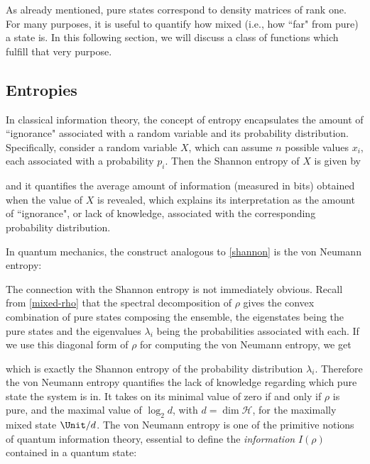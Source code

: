 \documentclass[12pt,a4paper,notitlepage]{report}
\begin{document}
As already mentioned, pure states correspond to density matrices of rank one. For many purposes, it is useful to quantify how mixed (i.e., how ``far" from pure) a state is. In this following section, we will discuss a class of functions which fulfill that very purpose.

\subsection{Entropies}
\label{sec:entropies}

In classical information theory, the concept of entropy encapsulates the amount of ``ignorance" associated with a random variable and its probability distribution. Specifically, consider a random variable $X$, which can assume $n$ possible values $x_i$, each associated with a probability $p_i$. Then the Shannon entropy \cite{shannon_1948} of $X$ is given by

%
and it quantifies the average amount of information (measured in bits) obtained when the value of $X$ is revealed, which explains its interpretation as the amount of ``ignorance", or lack of knowledge, associated with the corresponding probability distribution.

In quantum mechanics, the construct analogous to \eqref{shannon} is the von Neumann entropy:

%
The connection with the Shannon entropy is not immediately obvious. Recall from \eqref{mixed-rho} that the spectral decomposition of $\rho$ gives the convex combination of pure states composing the ensemble, the eigenstates being the pure states and the eigenvalues $\lambda_i$ being the probabilities associated with each. If we use this diagonal form of $\rho$ for computing the von Neumann entropy, we get

which is exactly the Shannon entropy of the probability distribution $\lambda_i$. Therefore the von Neumann entropy quantifies the lack of knowledge regarding which pure state the system is in. It takes on its minimal value of zero if and only if $\rho$ is pure, and the maximal value of $\log_2 d$, with $d = \dim{\mathcal{H}}$, for the maximally mixed state $\Unit/d$.
The von Neumann entropy is one of the primitive notions of quantum information theory, essential to define the {\it information} $I(\rho)$ contained in a quantum state:
\end{document}
